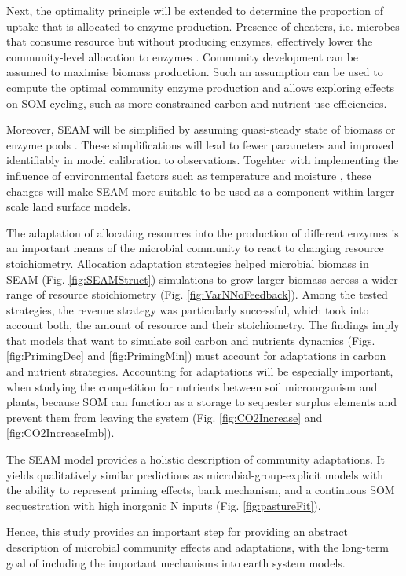 Next, the optimality principle will be extended to determine the proportion of
uptake that is allocated to enzyme production. Presence of cheaters, i.e.
microbes that consume resource but without producing enzymes, effectively lower
the community-level allocation to enzymes \citep{Kaiser14}. Community
development can be assumed to maximise biomass production. Such an assumption
can be used to compute the optimal community enzyme production and allows
exploring effects on SOM cycling, such as more constrained carbon and nutrient
use efficiencies.

Moreover, SEAM will be simplified by assuming quasi-steady state of biomass or
enzyme pools \citep{Wutzler13}. These simplifications will lead to fewer
parameters and improved identifiably in model calibration to observations.
Togehter with implementing the influence of environmental factors such as
temperature and moisture \citep{Davidson12}, these changes will make SEAM more
suitable to be used as a component within larger scale land surface models.
 

\conclusions   
 
The adaptation of allocating resources into the production of different enzymes
is an important means of the microbial community to react to changing resource
stoichiometry. Allocation adaptation strategies helped microbial biomass in SEAM
(Fig. \ref{fig:SEAMStruct}) simulations to grow larger biomass across a wider
range of resource stoichiometry (Fig. \ref{fig:VarNNoFeedback}). Among the
tested strategies, the revenue strategy was particularly successful, which took
into account both, the amount of resource and their stoichiometry.
The findings imply that models that want to simulate soil carbon and nutrients
dynamics (Figs. \ref{fig:PrimingDec} and \ref{fig:PrimingMin}) must account for
adaptations in carbon and nutrient strategies. Accounting for adaptations will
be especially important, when studying the competition for nutrients between
soil microorganism and plants, because SOM can function as a storage to
sequester surplus elements and prevent them from leaving the system (Fig.
\ref{fig:CO2Increase} and \ref{fig:CO2IncreaseImb}).

The SEAM model provides a holistic description of community adaptations. It
yields qualitatively similar predictions as microbial-group-explicit models
with the ability to represent priming effects, bank mechanism, and
a continuous SOM sequestration with high inorganic N inputs (Fig.
\ref{fig:pastureFit}).

Hence, this study provides an important step for providing an abstract
description of microbial community effects and adaptations, with the long-term
goal of including the important mechanisms into earth system models.



